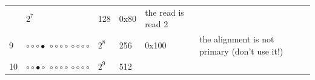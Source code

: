 \documentclass[]{krantz}
\begin{document}
\begin{longtable}[]{@{}llllll@{}}
\begin{minipage}[t]{0.12\columnwidth}
\end{minipage} & \begin{minipage}[t]{0.12\columnwidth}\raggedright
\(2^7\)\strut
\end{minipage} & \begin{minipage}[t]{0.07\columnwidth}\raggedright
128\strut
\end{minipage} & \begin{minipage}[t]{0.09\columnwidth}\raggedright
0x80\strut
\end{minipage} & \begin{minipage}[t]{0.35\columnwidth}\raggedright
the read is read 2\strut
\end{minipage}\tabularnewline
\begin{minipage}[t]{0.09\columnwidth}\raggedright
9\strut
\end{minipage} & \begin{minipage}[t]{0.12\columnwidth}\raggedright
\({\circ}{\circ}{\circ}{\bullet}~{\circ}{\circ}{\circ}{\circ}~{\circ}{\circ}{\circ}{\circ}\)\strut
\end{minipage} & \begin{minipage}[t]{0.12\columnwidth}\raggedright
\(2^8\)\strut
\end{minipage} & \begin{minipage}[t]{0.07\columnwidth}\raggedright
256\strut
\end{minipage} & \begin{minipage}[t]{0.09\columnwidth}\raggedright
0x100\strut
\end{minipage} & \begin{minipage}[t]{0.35\columnwidth}\raggedright
the alignment is not primary
(don't use it!)\strut
\end{minipage}\tabularnewline
\begin{minipage}[t]{0.09\columnwidth}\raggedright
10\strut
\end{minipage} & \begin{minipage}[t]{0.12\columnwidth}\raggedright
\({\circ}{\circ}{\bullet}{\circ}~{\circ}{\circ}{\circ}{\circ}~{\circ}{\circ}{\circ}{\circ}\)\strut
\end{minipage} & \begin{minipage}[t]{0.12\columnwidth}\raggedright
\(2^9\)\strut
\end{minipage} & \begin{minipage}[t]{0.07\columnwidth}\raggedright
512\strut
\end{minipage} & \begin{minipage}[t]{0.09\columnwidth}\raggedright

\end{minipage}
\end{longtable}
\end{document}
